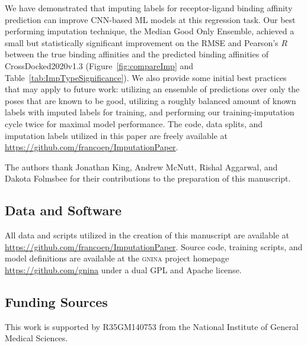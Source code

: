 \documentclass[journal=jcim,manuscript=article]{achemso}
\begin{document}
We have demonstrated that imputing labels for receptor-ligand binding affinity prediction can improve CNN-based ML models at this regression task.
Our best performing imputation technique, the Median Good Only Ensemble, achieved a small but statistically significant improvement on the RMSE and Pearson's $R$ between the true binding affinities and the predicted binding affinities of CrossDocked2020v1.3 (Figure~\ref{fig:compareImp} and Table~\ref{tab:ImpTypeSignificance}).
We also provide some initial best practices that may apply to future work: utilizing an ensemble of predictions over only the poses that are known to be good, utilizing a roughly balanced amount of known labels with imputed labels for training, and performing our training-imputation cycle twice for maximal model performance.
The code, data splits, and imputation labels utilized in this paper are freely available at \url{https://github.com/francoep/ImputationPaper}.


\begin{acknowledgement}

The authors thank Jonathan King, Andrew McNutt, Rishal Aggarwal, and Dakota Folmsbee for their contributions to the preparation of this manuscript.

\subsection{Data and Software}
All data and scripts utilized in the creation of this manuscript are available at \url{https://github.com/francoep/ImputationPaper}.
Source code, training scripts, and model definitions are available at the \textsc{gnina} project homepage \url{https://github.com/gnina} under a dual GPL and Apache license.

\subsection{Funding Sources}
This work is supported by R35GM140753 from the National Institute of General Medical Sciences.

\end{acknowledgement}

\end{document}

